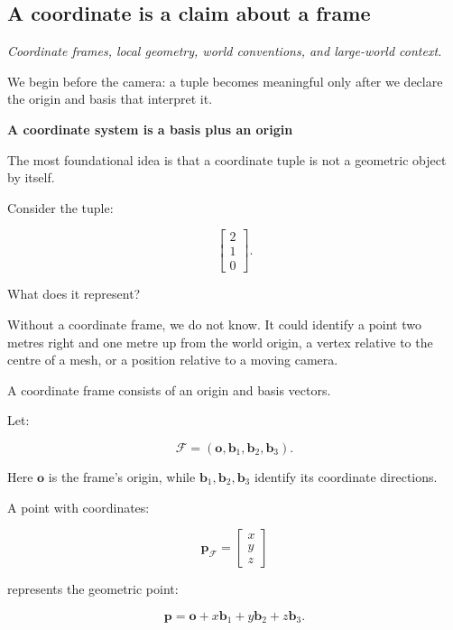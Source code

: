 \subsection{A coordinate is a claim about a frame}\label{02-foundations-ii-ch032-a-coordinate-is-a-claim-about-a-frame}

\hypertarget{02-foundations-ii-ch032-a-coordinate-is-a-claim-about-a-frame}{}


\emph{Coordinate frames, local geometry, world conventions, and large-world context.}

We begin before the camera: a tuple becomes meaningful only after we declare the origin and basis that interpret it.

\textbf{A coordinate system is a basis plus an origin}

The most foundational idea is that a coordinate tuple is not a geometric object by itself.

Consider the tuple:

\[
 \begin{bmatrix}2\\1\\0\end{bmatrix}.
\]

What does it represent?

Without a coordinate frame, we do not know. It could identify a point two metres right and one metre up from the world origin, a vertex relative to the centre of a mesh, or a position relative to a moving camera.

A coordinate frame consists of an origin and basis vectors.

Let:

\[
 \mathcal F=(\mathbf o,\mathbf b_1,\mathbf b_2,\mathbf b_3).
\]

Here \(\mathbf o\) is the frame's origin, while \(\mathbf b_1,\mathbf b_2,\mathbf b_3\) identify its coordinate directions.

A point with coordinates:

\[
 \mathbf p_{\mathcal F}= \begin{bmatrix}x\\y\\z\end{bmatrix}
\]

represents the geometric point:

\[
 \boxed{ \mathbf p= \mathbf o+x\mathbf b_1+y\mathbf b_2+z\mathbf b_3 }.
\]

